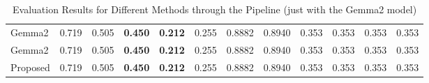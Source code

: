\begin{table}
{\begin{tabular}{l|cccccccccc||c}
            Gemma2                             & 0.719                                                   & 0.505                                                   & \textbf{0.450}                                          & \textbf{0.212}                                                    & 0.255                                                    & 0.8882                                                    & 0.8940                                                            & 0.353                                                    & 0.353                                  & 0.353                                    & 0.353 \\
            Gemma2                             & 0.719                                                   & 0.505                                                   & \textbf{0.450}                                          & \textbf{0.212}                                                    & 0.255                                                    & 0.8882                                                    & 0.8940                                                            & 0.353                                                    & 0.353                                  & 0.353                                    & 0.353 \\
            Proposed                           & 0.719                                                   & 0.505                                                   & \textbf{0.450}                                          & \textbf{0.212}                                                    & 0.255                                                    & 0.8882                                                    & 0.8940                                                            & 0.353                                                    & 0.353                                  & 0.353                                    & 0.353 \\
            \bottomrule
        \end{tabular}}
    \caption{Evaluation Results for Different Methods through the Pipeline (just with the Gemma2 model)}
    \label{tab:evaluation_results-kossher}
\end{table}


